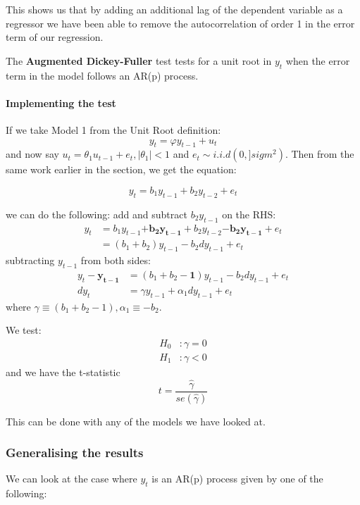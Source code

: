 \documentclass[11pt]{article}
\begin{document}
This shows us that by adding an additional lag of the dependent variable as a regressor we have been able to remove the autocorrelation of order 1 in the error term of our regression. 
 
The \textbf{Augmented Dickey-Fuller} test tests for a unit root in $y_t$ when the error term in the model follows an AR(p) process.

\begin{mdframed}
\paragraph{Implementing the test} \mbox{}

If we take Model 1 from the Unit Root definition:
\[y_t = \varphi y_{t-1} + u_t\]
and now say $u_t = \theta_1 u_{t-1} + e_t, |\theta_1|<1$ and $e_t\sim i.i.d(0,]sigm
^2)$. Then from the same work earlier in the section, we get the equation:

\[y_t = b_1 y_{t-1} + b_2 y_{t-2} + e_t\]

we can do the following:
add and subtract $b_2 y_{t-1}$ on the RHS:
\begin{align*}
    y_t &= b_1 y_{t-1} \boldsymbol{+ b_2 y_{t-1}}+ b_2 y_{t-2} \boldsymbol{- b_2 y_{t-1}} + e_t \\
    &= (b_1 + b_2) y_{t-1} - b_2 dy_{t-1} + e_t
\end{align*}
subtracting $y_{t-1}$ from both sides:
\begin{align*}
    y_t - \boldsymbol{y_{t-1}} &= (b_1 + b_2 - \boldsymbol{1})y_{t-1} - b_2 dy_{t-1} + e_t \\
    dy_t &= \gamma y_{t-1} + \alpha_1 dy_{t-1} + e_t
\end{align*}
where $ \gamma \equiv (b_1+b_2-1), \alpha_1 \equiv -b_2$.

We test:
\begin{align*}
    H_0&: \gamma = 0 \\
    H_1&: \gamma < 0
\end{align*}
and we have the t-statistic
\[t = \dfrac{\hat{\gamma}}{se(\hat{\gamma})}\]

This can be done with any of the models we have looked at.
\end{mdframed}

\subsubsection{Generalising the results}

We can look at the case where $y_t$ is an AR(p) process given by one of the following:
\end{document}
